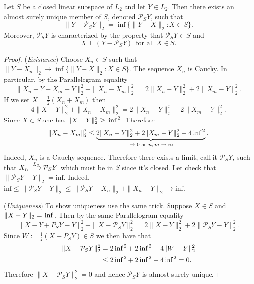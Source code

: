 \begin{theorem}
Let $S$ be a closed linear subspace of $L_2$ and let $Y\in L_2$. Then there exists an almost surely unique member of $S$, denoted $\mathcal P_S Y$, such that
\begin{equation}
\label{first char of proj}
\|Y - \mathcal P_S Y  \|_2 = \inf \{\|Y- X\|_2\colon X \in S  \}.
\end{equation}
Moreover, $\mathcal P_S Y$ is characterized by the property that $\mathcal P_S Y\in S$ and
\begin{equation}
\label{scnd char of proj}
X\perp (Y - \mathcal P_S Y )\,\text{ for all $X\in S$}.
\end{equation}
\end{theorem}
\begin{proof}
({\sl Existance}) Choose $X_n\in S$ such that $\|Y-X_n\|_2\rightarrow \inf \{\|Y- X\|_2\colon X \in S  \}$. The sequence $X_n$ is Cauchy. In particular, by the Parallelogram equality
\[ \|X_n-Y + X_m-Y \|_2^2 + \|X_n-X_m \|_2^2= 2\|X_n-Y  \|_2^2 + 2\| X_m-Y  \|_2^2.\]
If we set $X = \frac{1}{2}(X_n+X_m)$ then
\[ 4\|X -Y \|_2^2 + \|X_n-X_m \|_2^2= 2\|X_n-Y  \|_2^2 + 2\| X_m-Y  \|_2^2.\]
 Since $X\in S$ one has  $\|X -Y \|_2^2\geq \text{\,inf\,}^2$. Therefore
\[  \|X_n-X_m \|_2^2 \leq \underbrace{ 2\|X_n-Y  \|_2^2 + 2\| X_m-Y  \|_2^2 - 4\text{\,inf\,}^2}_{\text{ $\rightarrow 0$ as $n,m \rightarrow \infty$}}. \]
Indeed, $X_n$ is a Cauchy sequence. Therefore there exists a limit, call it $\mathcal P_S Y$, such that   $X_n \overset{\small L_2} \longrightarrow \mathcal P_SY$ which must be in $S$ since it's closed. Let check that $\|\mathcal P_S Y - Y \|_2 = \text{inf}$. Indeed, $\text{inf}\leq \|\mathcal P_S Y - Y \|_2\leq \|\mathcal P_S Y - X_n \|_2+ \|X_n - Y\|_2 \rightarrow \text{inf}$.

({\sl Uniqueness}) To show uniqueness use the same trick. Suppose $X\in S$ and $\|X-Y\|_2 =  \text{\,inf\,}$. Then by the same Parallelogram equality
\[ \|X-Y + P_S Y -Y \|_2^2 + \|X - \mathcal P_S Y \|_2^2= 2\|X - Y  \|_2^2 + 2\| \mathcal P_S Y - Y  \|_2^2.\]
Since $W := \frac{1}{2}(X+ P_S Y)\in S$ we then have that
\begin{align*}
\|X - \mathcal P_S Y \|_2^2
&=   2\text{\,inf\,}^2 +2\text{\,inf\,}^2 - 4\|W - Y \|_2^2  \\
&\leq  2\text{\,inf\,}^2 +2\text{\,inf\,}^2 - 4\text{\,inf\,}^2  = 0.
\end{align*}
Therefore $\|X - \mathcal P_S Y \|_2^2=0$ and hence $\mathcal P_S Y$ is almost surely unique.


\end{proof}
